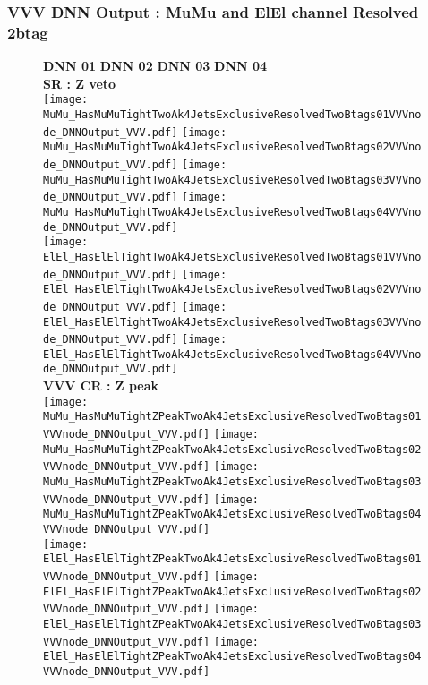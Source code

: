 \documentclass[9pt]{beamer}
\begin{document}
\begin{frame}
	\frametitle{VVV DNN Output : MuMu and ElEl channel Resolved 2btag}
	\begin{figure}
	    \textbf{DNN 01} \hspace{1.2cm} \textbf{DNN 02} \hspace{1.2cm} \textbf{DNN 03} \hspace{1.2cm} \textbf{DNN 04} \\
        \centering
        \textbf{SR : Z veto} \\
		\texttt{[image: MuMu\_HasMuMuTightTwoAk4JetsExclusiveResolvedTwoBtags01VVVnode\_DNNOutput\_VVV.pdf]}
		\texttt{[image: MuMu\_HasMuMuTightTwoAk4JetsExclusiveResolvedTwoBtags02VVVnode\_DNNOutput\_VVV.pdf]}
		\texttt{[image: MuMu\_HasMuMuTightTwoAk4JetsExclusiveResolvedTwoBtags03VVVnode\_DNNOutput\_VVV.pdf]}
		\texttt{[image: MuMu\_HasMuMuTightTwoAk4JetsExclusiveResolvedTwoBtags04VVVnode\_DNNOutput\_VVV.pdf]}\\
		\texttt{[image: ElEl\_HasElElTightTwoAk4JetsExclusiveResolvedTwoBtags01VVVnode\_DNNOutput\_VVV.pdf]}
		\texttt{[image: ElEl\_HasElElTightTwoAk4JetsExclusiveResolvedTwoBtags02VVVnode\_DNNOutput\_VVV.pdf]}
		\texttt{[image: ElEl\_HasElElTightTwoAk4JetsExclusiveResolvedTwoBtags03VVVnode\_DNNOutput\_VVV.pdf]}
		\texttt{[image: ElEl\_HasElElTightTwoAk4JetsExclusiveResolvedTwoBtags04VVVnode\_DNNOutput\_VVV.pdf]}\\
        \textbf{VVV CR : Z peak} \\
		\texttt{[image: MuMu\_HasMuMuTightZPeakTwoAk4JetsExclusiveResolvedTwoBtags01VVVnode\_DNNOutput\_VVV.pdf]}
		\texttt{[image: MuMu\_HasMuMuTightZPeakTwoAk4JetsExclusiveResolvedTwoBtags02VVVnode\_DNNOutput\_VVV.pdf]}
		\texttt{[image: MuMu\_HasMuMuTightZPeakTwoAk4JetsExclusiveResolvedTwoBtags03VVVnode\_DNNOutput\_VVV.pdf]}
		\texttt{[image: MuMu\_HasMuMuTightZPeakTwoAk4JetsExclusiveResolvedTwoBtags04VVVnode\_DNNOutput\_VVV.pdf]}\\
		\texttt{[image: ElEl\_HasElElTightZPeakTwoAk4JetsExclusiveResolvedTwoBtags01VVVnode\_DNNOutput\_VVV.pdf]}
		\texttt{[image: ElEl\_HasElElTightZPeakTwoAk4JetsExclusiveResolvedTwoBtags02VVVnode\_DNNOutput\_VVV.pdf]}
		\texttt{[image: ElEl\_HasElElTightZPeakTwoAk4JetsExclusiveResolvedTwoBtags03VVVnode\_DNNOutput\_VVV.pdf]}
		\texttt{[image: ElEl\_HasElElTightZPeakTwoAk4JetsExclusiveResolvedTwoBtags04VVVnode\_DNNOutput\_VVV.pdf]}\\
	\end{figure}
\end{frame}
\end{document}
